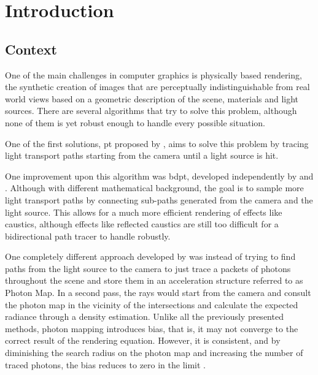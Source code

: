 \chapter{Introduction}

\section{Context}

One of the main challenges in computer graphics is physically based rendering, the synthetic creation of images that are perceptually indistinguishable from real world views based on a geometric description of the scene, materials and light sources. There are several algorithms that try to solve this problem, although none of them is yet robust enough to handle every possible situation.

One of the first solutions, \gls{pt} proposed by \cite{Kajiya}, aims to solve this problem by tracing light transport paths starting from the camera until a light source is hit.

One improvement upon this algorithm was \gls{bdpt}, developed independently by \cite{Lafortune} and \cite{Veach}. Although with different mathematical background, the goal is to sample more light transport paths by connecting sub-paths generated from the camera and the light source. This allows for a much more efficient rendering of effects like caustics, although
effects like reflected caustics are still too difficult for a bidirectional path tracer to handle robustly.


One completely different approach developed by \cite{Jensen} was instead of trying to find paths from the light source to the camera to just trace a packets of photons throughout the scene and store them in an acceleration structure referred to as Photon Map. In a second pass, the rays would start from the camera and consult the photon map in the vicinity of the intersections and calculate the expected radiance through a density estimation. Unlike all the previously presented methods, photon mapping introduces bias, that is, it may not converge to the correct result of the rendering equation. However, it is consistent, and by diminishing the search radius on the photon map and increasing the number of traced photons, the bias reduces to zero in the limit \citep{Hachisuka}.

